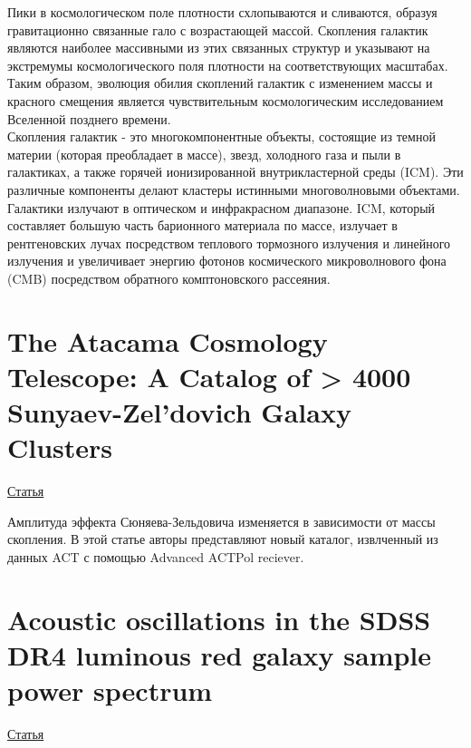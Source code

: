\documentclass{article}
\begin{document}
Пики в космологическом поле плотности схлопываются и сливаются, образуя гравитационно связанные 
гало с возрастающей массой. Скопления галактик являются наиболее массивными из этих связанных 
структур и указывают на экстремумы космологического поля плотности на соответствующих масштабах.
Таким образом, эволюция обилия скоплений галактик с изменением массы и красного смещения является
чувствительным космологическим исследованием Вселенной позднего времени.\\

Скопления галактик - это многокомпонентные объекты, состоящие из темной материи (которая 
преобладает в массе), звезд, холодного газа и пыли в галактиках, а также горячей ионизированной
внутрикластерной среды (ICM). Эти различные компоненты делают кластеры истинными многоволновыми 
объектами. Галактики излучают в оптическом и инфракрасном диапазоне. ICM, который составляет 
большую часть барионного материала по массе, излучает в рентгеновских лучах посредством теплового
тормозного излучения и линейного излучения и увеличивает энергию фотонов космического микроволнового 
фона (CMB) посредством обратного комптоновского рассеяния.\\

\section{The Atacama Cosmology Telescope: A Catalog of > 4000 Sunyaev-Zel’dovich Galaxy Clusters}
\hyperlink{https://arxiv.org/pdf/2009.11043.pdf}{Статья}

Амплитуда эффекта Сюняева-Зельдовича изменяется в зависимости от массы скопления. В этой статье 
авторы представляют новый каталог, извлченный из данных ACT с помощью Advanced ACTPol reciever.\\

\section{Acoustic oscillations in the SDSS DR4 luminous red galaxy sample power spectrum}
\hyperlink{https://www.aanda.org/articles/aa/pdf/2006/15/aa3939-05.pdf}{Статья}
\end{document}
